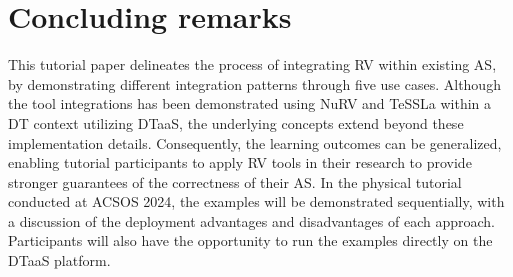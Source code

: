 \section{Concluding remarks} \label{sec:conclude}

This tutorial paper delineates the process of integrating RV within existing AS, by demonstrating different integration patterns through five use cases.
Although the tool integrations has been demonstrated using NuRV and TeSSLa within a DT context utilizing DTaaS, the underlying concepts extend beyond these implementation details.
Consequently, the learning outcomes can be generalized, enabling tutorial participants to apply RV tools in their research to provide stronger guarantees of the correctness of their AS.
In the physical tutorial conducted at ACSOS 2024, the examples will be demonstrated sequentially, with a discussion of the deployment advantages and disadvantages of each approach.
Participants will also have the opportunity to run the examples directly on the DTaaS platform.